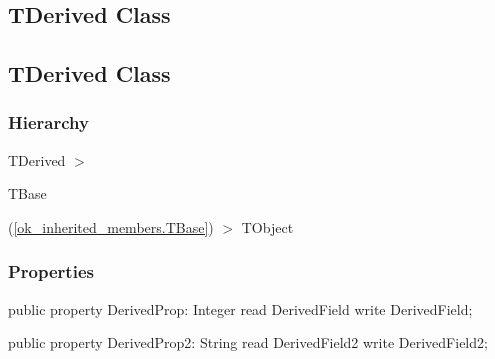\documentclass{report}
\newif\ifpdf
\begin{document}
\subsection*{\large{\textbf{TDerived Class}}\normalsize\hspace{1ex}\hrulefill}
\else
\subsection*{TDerived Class}
\fi
\label{ok_inherited_members.TDerived}
\subsubsection*{\large{\textbf{Hierarchy}}\normalsize\hspace{1ex}\hfill}
TDerived {$>$} \begin{ttfamily}TBase\end{ttfamily}(\ref{ok_inherited_members.TBase}) {$>$} 
TObject
\subsubsection*{\large{\textbf{Properties}}\normalsize\hspace{1ex}\hfill}
\begin{list}{}{
\setlength{\itemindent}{0cm}
\setlength{\listparindent}{0cm}
\setlength{\leftmargin}{\evensidemargin}
\addtolength{\leftmargin}{\tmplength}
\settowidth{\labelsep}{X}
\addtolength{\leftmargin}{\labelsep}
\setlength{\labelwidth}{\tmplength}
}
\label{ok_inherited_members.TDerived-DerivedProp}
\item[\textbf{DerivedProp}\hfill]
\ifpdf
\begin{flushleft}
\fi
\begin{ttfamily}
public property DerivedProp: Integer read DerivedField write DerivedField;\end{ttfamily}

\ifpdf
\end{flushleft}
\fi


\par  \label{ok_inherited_members.TDerived-DerivedProp2}
\item[\textbf{DerivedProp2}\hfill]
\ifpdf
\begin{flushleft}
\fi
\begin{ttfamily}
public property DerivedProp2: String read DerivedField2 write DerivedField2;\end{ttfamily}

\ifpdf
\end{flushleft}
\fi


\par  \end{list}
\end{document}
